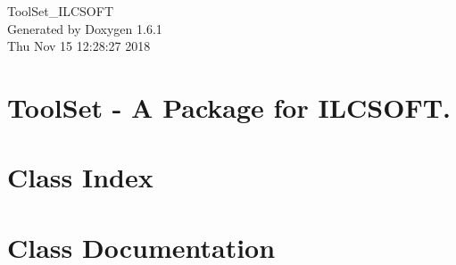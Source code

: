 \documentclass[a4paper]{book}
\begin{document}
\hypersetup{pageanchor=false}
\begin{titlepage}
\vspace*{7cm}
\begin{center}
{\Large ToolSet\_\-ILCSOFT }\\
\vspace*{1cm}
{\large Generated by Doxygen 1.6.1}\\
\vspace*{0.5cm}
{\small Thu Nov 15 12:28:27 2018}\\
\end{center}
\end{titlepage}
\clearemptydoublepage
{}
\tableofcontents
\clearemptydoublepage
{}
\hypersetup{pageanchor=true}
\chapter{ToolSet -\/ A Package for ILCSOFT.}
\label{index}\hypertarget{index}{}
\chapter{Class Index}

\chapter{Class Documentation}







\printindex
\end{document}
